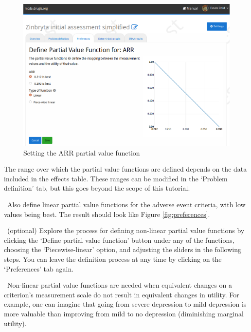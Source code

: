 \documentclass[00_mcda_tutorial.tex]{subfiles}
\begin{document}
\begin{figure}[!h]
    \centering
	\includegraphics[width=\textwidth]{fig/setPvf.png}
    \caption{Setting the ARR partial value function}
	\label{fig:pvf}
\end{figure}

\noindent The range over which the partial value functions are defined depends on the data included in the effects table. These ranges can be modified in the ‘Problem definition’ tab, but this goes beyond the scope of this tutorial.
\newline

\noindent \leftpointright \, Also define linear partial value functions for the adverse event criteria, with low values being best. The result should look like Figure \ref{fig:preferences}.
\newline

\noindent \leftpointright \, (optional) Explore the process for defining non-linear partial value functions by clicking the ‘Define partial value function’ button under any of the functions, choosing the ‘Piecewise-linear’ option, and adjusting the sliders in the following steps. You can leave the definition process at any time by clicking on the ‘Preferences’ tab again.
\newline

\noindent \faGraduationCap \, Non-linear partial value functions are needed when equivalent changes on a criterion’s measurement scale do not result in equivalent changes in utility.  For example, one can imagine that going from severe depression to mild depression is more valuable than improving from mild to no depression (diminishing marginal utility).
\end{document}
